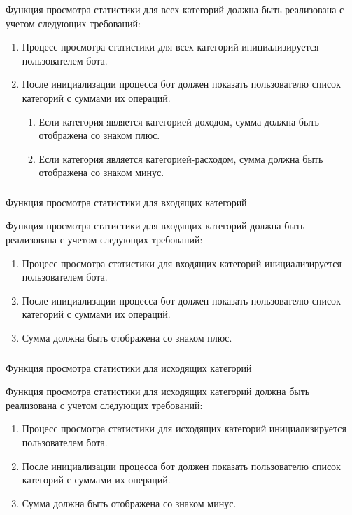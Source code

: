 Функция просмотра статистики для всех категорий должна быть реализована с учетом следующих требований:

\begin{enumerate}
	\item Процесс просмотра статистики для всех категорий инициализируется пользователем бота.
	\item После инициализации процесса бот должен показать пользователю список категорий с суммами их операций.
	\begin{enumerate}
		\item Если категория является категорией-доходом, сумма должна быть отображена со знаком плюс.
		\item Если категория является категорией-расходом, сумма должна быть отображена со знаком минус.
	\end{enumerate}
\end{enumerate}

\subsubsection{} Функция просмотра статистики для входящих категорий
\label{sec:domain:specification:showincomestats}

Функция просмотра статистики для входящих категорий должна быть реализована с учетом следующих требований:

\begin{enumerate}
	\item Процесс просмотра статистики для входящих категорий инициализируется пользователем бота.
	\item После инициализации процесса бот должен показать пользователю список категорий с суммами их операций.
	\item Сумма должна быть отображена со знаком плюс.
\end{enumerate}

\subsubsection{} Функция просмотра статистики для исходящих категорий
\label{sec:domain:specification:showexpensestats}

Функция просмотра статистики для исходящих категорий должна быть реализована с учетом следующих требований:

\begin{enumerate}
	\item Процесс просмотра статистики для исходящих категорий инициализируется пользователем бота.
	\item После инициализации процесса бот должен показать пользователю список категорий с суммами их операций.
	\item Сумма должна быть отображена со знаком минус.
\end{enumerate}

